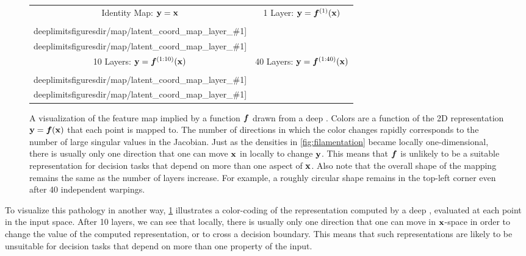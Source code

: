 \documentclass{article} %
\begin{document}
\newcommand{\mappic}[1]{ \texttt{[image: \\deeplimitsfiguresdir/map/latent\_coord\_map\_layer\_\#1]} } 
\newcommand{\mappiccon}[1]{ \texttt{[image: \\deeplimitsfiguresdir/map\_connected/latent\_coord\_map\_layer\_\#1]} }
\begin{figure}
\centering
\begin{tabular}{cc}
\hspace{-0.15in} Identity Map: ${\bf{y}} = {\bf{x}}$ &
\hspace{-0.15in} 1 Layer: ${\bf{y}} = \boldsymbol{f}^{(1)}({\bf{x}})$ \\
\hspace{-0.15in} \mappic{0} & \mappic{1} \\
\hspace{-0.15in} 10 Layers: ${\bf{y}} = \boldsymbol{f}^{(1:10)}({\bf{x}})$ &
\hspace{-0.15in} 40 Layers: ${\bf{y}} = \boldsymbol{f}^{(1:40)}({\bf{x}})$ \\
\hspace{-0.15in} \mappic{10} & \mappic{40}
\end{tabular}
\caption[Visualization of a feature map drawn from a deep \sgp{}]
{A visualization of the feature map implied by a function $\boldsymbol{f}$ drawn from a deep \gp{}.
Colors are a function of the 2D representation ${\bf{y}} = \boldsymbol{f}({\bf{x}})$ that each point is mapped to. %
The number of directions in which the color changes rapidly corresponds to the number of large singular values in the Jacobian.
Just as the densities in \cref{fig:filamentation} became locally one-dimensional, there is usually only one direction that one can move ${\bf{x}}$ in locally to change ${\bf{y}}$.
This means that $\boldsymbol{f}$ is unlikely to be a suitable representation for decision tasks that depend on more than one aspect of ${\bf{x}}$.  Also note that the overall shape of the mapping remains the same as the number of layers increase.
For example, a roughly circular shape remains in the top-left corner even after 40 independent warpings.}
\label{fig:deep_map}
\end{figure}
%
To visualize this pathology in another way, \cref{fig:deep_map} illustrates a color-coding of the representation computed by a deep \gp{}, evaluated at each point in the input space.
After 10 layers, we can see that locally, there is usually only one direction that one can move in ${\bf{x}}$-space in order to change the value of the computed representation, or to cross a decision boundary.
This means that such representations are likely to be unsuitable for decision tasks that depend on more than one property of the input.
\end{document}
